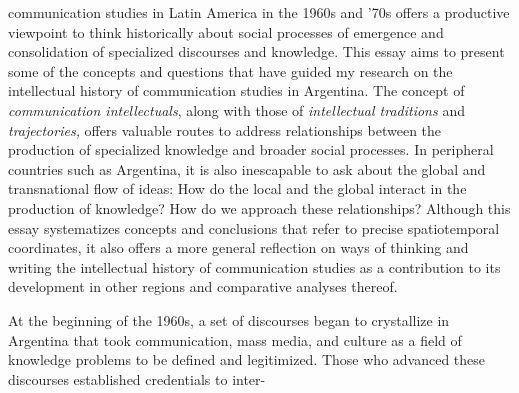\documentclass{tufte-handout}
\begin{document}
\begin{titlepage}
\vspace*{1em}


 communication studies in Latin America in the 1960s and
'70s offers a productive viewpoint to think historically about social
processes of emergence and consolidation of specialized discourses and
knowledge. This essay aims to present some of the concepts and questions
that have guided my research on the intellectual history of
communication studies in Argentina. The concept of \emph{communication
intellectuals}, along with those of \emph{intellectual traditions} and
\emph{trajectories,} offers valuable routes to address relationships
between the production of specialized knowledge and broader social
processes. In peripheral countries such as Argentina, it is also
inescapable to ask about the global and transnational flow of ideas: How
do the local and the global interact in the production of knowledge? How
do we approach these relationships? Although this essay systematizes
concepts and conclusions that refer to precise spatiotemporal
coordinates, it also offers a more general reflection on ways of
thinking and writing the intellectual history of communication studies
as a contribution to its development in other regions and comparative
analyses thereof.

At the beginning of the 1960s, a set of discourses began to crystallize
in Argentina that took communication, mass media, and culture as a field
of knowledge problems to be defined and legitimized. Those who advanced
these discourses established credentials to inter-

\enlargethispage{2\baselineskip}

\vspace*{2em}





 \end{titlepage}
\end{document}
